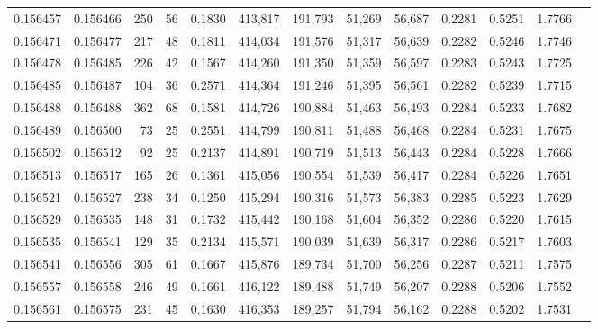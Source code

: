 \begin{tabular}{rrrrrrrrrrrrr}
0.156457 & 0.156466 &   250 &  56 &                                     0.1830 & 413,817 & 191,793 &  51,269 &  56,687 & 0.2281 & 0.5251 & 1.7766 \\
0.156471 & 0.156477 &   217 &  48 &                                     0.1811 & 414,034 & 191,576 &  51,317 &  56,639 & 0.2282 & 0.5246 & 1.7746 \\
0.156478 & 0.156485 &   226 &  42 &                                     0.1567 & 414,260 & 191,350 &  51,359 &  56,597 & 0.2283 & 0.5243 & 1.7725 \\
0.156485 & 0.156487 &   104 &  36 &                                     0.2571 & 414,364 & 191,246 &  51,395 &  56,561 & 0.2282 & 0.5239 & 1.7715 \\
0.156488 & 0.156488 &   362 &  68 &                                     0.1581 & 414,726 & 190,884 &  51,463 &  56,493 & 0.2284 & 0.5233 & 1.7682 \\
0.156489 & 0.156500 &    73 &  25 &                                     0.2551 & 414,799 & 190,811 &  51,488 &  56,468 & 0.2284 & 0.5231 & 1.7675 \\
0.156502 & 0.156512 &    92 &  25 &                                     0.2137 & 414,891 & 190,719 &  51,513 &  56,443 & 0.2284 & 0.5228 & 1.7666 \\
0.156513 & 0.156517 &   165 &  26 &                                     0.1361 & 415,056 & 190,554 &  51,539 &  56,417 & 0.2284 & 0.5226 & 1.7651 \\
0.156521 & 0.156527 &   238 &  34 &                                     0.1250 & 415,294 & 190,316 &  51,573 &  56,383 & 0.2285 & 0.5223 & 1.7629 \\
0.156529 & 0.156535 &   148 &  31 &                                     0.1732 & 415,442 & 190,168 &  51,604 &  56,352 & 0.2286 & 0.5220 & 1.7615 \\
0.156535 & 0.156541 &   129 &  35 &                                     0.2134 & 415,571 & 190,039 &  51,639 &  56,317 & 0.2286 & 0.5217 & 1.7603 \\
0.156541 & 0.156556 &   305 &  61 &                                     0.1667 & 415,876 & 189,734 &  51,700 &  56,256 & 0.2287 & 0.5211 & 1.7575 \\
0.156557 & 0.156558 &   246 &  49 &                                     0.1661 & 416,122 & 189,488 &  51,749 &  56,207 & 0.2288 & 0.5206 & 1.7552 \\
0.156561 & 0.156575 &   231 &  45 &                                     0.1630 & 416,353 & 189,257 &  51,794 &  56,162 & 0.2288 & 0.5202 & 1.7531 \\

\end{tabular}
